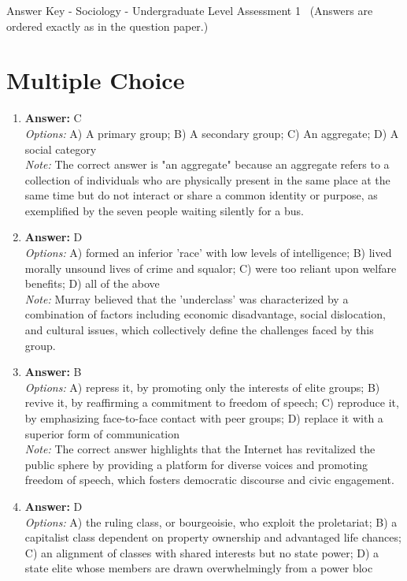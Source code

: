 \documentclass[12pt]{article}
\begin{document}
\begin{center}
Answer Key - Sociology - Undergraduate Level Assessment 1 \
\small (Answers are ordered exactly as in the question paper.)
\end{center}

\section*{Multiple Choice}
\begin{enumerate}[label=\arabic*.]
\item \textbf{Answer:} C
\\ \textit{Options:} A) A primary group; B) A secondary group; C) An aggregate; D) A social category
\\ \textit{Note:} The correct answer is "an aggregate" because an aggregate refers to a collection of individuals who are physically present in the same place at the same time but do not interact or share a common identity or purpose, as exemplified by the seven people waiting silently for a bus.
\item \textbf{Answer:} D
\\ \textit{Options:} A) formed an inferior 'race' with low levels of intelligence; B) lived morally unsound lives of crime and squalor; C) were too reliant upon welfare benefits; D) all of the above
\\ \textit{Note:} Murray believed that the 'underclass' was characterized by a combination of factors including economic disadvantage, social dislocation, and cultural issues, which collectively define the challenges faced by this group.
\item \textbf{Answer:} B
\\ \textit{Options:} A) repress it, by promoting only the interests of elite groups; B) revive it, by reaffirming a commitment to freedom of speech; C) reproduce it, by emphasizing face-to-face contact with peer groups; D) replace it with a superior form of communication
\\ \textit{Note:} The correct answer highlights that the Internet has revitalized the public sphere by providing a platform for diverse voices and promoting freedom of speech, which fosters democratic discourse and civic engagement.
\item \textbf{Answer:} D
\\ \textit{Options:} A) the ruling class, or bourgeoisie, who exploit the proletariat; B) a capitalist class dependent on property ownership and advantaged life chances; C) an alignment of classes with shared interests but no state power; D) a state elite whose members are drawn overwhelmingly from a power bloc

\end{enumerate}
\end{document}
